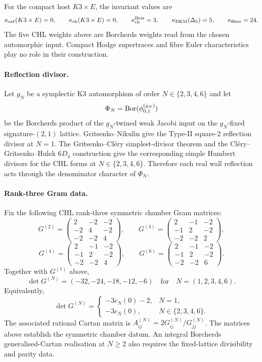 For the compact host $K3\times E$, the invariant values are
\[
  \kappa_{\mathrm{cat}}(K3\times E)=0,\qquad
  \kappa_{\mathrm{ch}}(K3\times E)=0,\qquad
  \kappa_{\mathrm{ch}}^{\mathrm{Heis}}=3,\qquad
  \kappa_{\mathrm{BKM}}(\Delta_5)=5,\qquad
  \kappa_{\mathrm{fiber}}=24.
\]
The five CHL weights above are Borcherds weights read from the chosen
automorphic input. Compact Hodge supertraces and fibre Euler
characteristics play no role in their construction.

\paragraph{Reflection divisor.}
Let $g_N$ be a symplectic K3 automorphism of order
$N\in\{2,3,4,6\}$ and let
\[
  \Phi_N=\operatorname{Bor}(\phi^{(g_N)}_{0,1})
\]
be the Borcherds product of the $g_N$-twined weak Jacobi input on the
$g_N$-fixed signature-$(2,1)$ lattice. Gritsenko--Nikulin give the
Type-II square-$2$ reflection divisor at $N=1$. The
Gritsenko--Cl\'ery simplest-divisor theorem and the
Cl\'ery--Gritsenko--Hulek $6D_4$ construction give the corresponding
simple Humbert divisors for the CHL forms at $N\in\{2,3,4,6\}$.
Therefore each real wall reflection acts through the denominator
character of $\Phi_N$.

\paragraph{Rank-three Gram data.}
Fix the following CHL rank-three symmetric chamber Gram matrices:
\[
  G^{(2)} =
  \begin{pmatrix} 2 & -2 & -2 \\ -2 & 4 & -2 \\ -2 & -2 & 4 \end{pmatrix},
  \qquad
  G^{(3)} =
  \begin{pmatrix} 2 & -1 & -2 \\ -1 & 2 & -2 \\ -2 & -2 & 2 \end{pmatrix},
\]
\[
  G^{(4)} =
  \begin{pmatrix} 2 & -1 & -2 \\ -1 & 2 & -2 \\ -2 & -2 & 4 \end{pmatrix},
  \qquad
  G^{(6)} =
  \begin{pmatrix} 2 & -1 & -2 \\ -1 & 2 & -2 \\ -2 & -2 & 6 \end{pmatrix}.
\]
Together with $G^{(1)}$ above,
\[
  \det G^{(N)}=(-32,-24,-18,-12,-6)
  \quad\text{for}\quad N=(1,2,3,4,6).
\]
Equivalently,
\[
  \det G^{(N)}=
  \begin{cases}
    -3c_N(0)-2, & N=1,\\
    -3c_N(0), & N\in\{2,3,4,6\}.
  \end{cases}
\]
The associated rational Cartan matrix is
$A^{(N)}_{ij}=2G^{(N)}_{ij}/G^{(N)}_{jj}$. The matrices above establish
the symmetric chamber datum. An integral Borcherds generalised-Cartan
realisation at $N\geq2$ also requires the fixed-lattice divisibility and
parity data.

